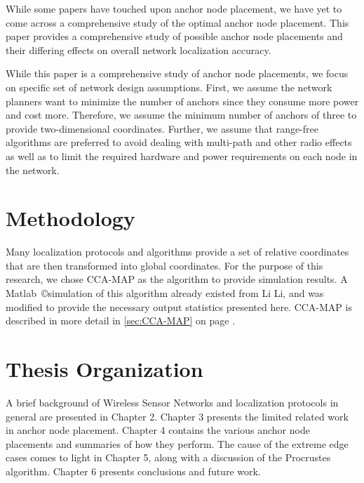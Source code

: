 While some papers have touched upon anchor node placement, we have yet to come across a comprehensive study of the optimal anchor node placement.  This paper provides a comprehensive study of possible anchor node placements and their differing effects on overall network localization accuracy.

While this paper is a comprehensive study of anchor node placements, we focus on specific set of network design assumptions.  First, we assume the network planners want to minimize the number of anchors since they consume more power and cost more.  Therefore, we assume the minimum number of anchors of three to provide two-dimensional coordinates. Further, we assume that range-free algorithms are preferred to avoid dealing with multi-path and other radio effects as well as to limit the required hardware and power requirements on each node in the network.  

\section{Methodology}
Many localization protocols and algorithms provide a set of relative coordinates that are then transformed into global coordinates.  For the purpose of this research, we chose CCA-MAP\cite{CCA-MAP07,CCA-MAP09} as the algorithm to provide simulation results.  A Matlab~\copyright simulation of this algorithm already existed from Li Li\cite{CCA-MAP07}, and was modified to provide the necessary output statistics presented here.  CCA-MAP is described in more detail in \ref{sec:CCA-MAP} on page \pageref{sec:CCA-MAP}.

\section{Thesis Organization}
A brief background of Wireless Sensor Networks and localization protocols in general are presented in Chapter 2.  Chapter 3 presents the limited related work in anchor node placement.  Chapter 4 contains the various anchor node placements and summaries of how they perform.  The cause of the extreme edge cases comes to light in Chapter 5, along with a discussion of the Procrustes algorithm.  Chapter 6 presents conclusions and future work.

